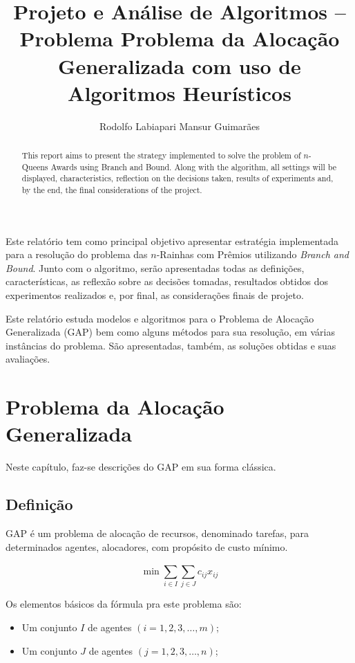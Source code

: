 \documentclass[12pt]{article}
\title{Projeto e Análise de Algoritmos -- \\ Problema Problema da Alocação Generalizada com uso de Algoritmos Heurísticos}
\author{Rodolfo Labiapari Mansur Guimarães}
\begin{document}
\maketitle

\begin{abstract}
	This report aims to present the strategy implemented to solve the problem of $n$-Queens Awards using Branch and Bound. Along with the algorithm, all settings will be displayed, characteristics, reflection on the decisions taken, results of experiments and, by the end, the final considerations of the project.
\end{abstract}

\begin{resumo}
Este relatório tem como principal objetivo apresentar estratégia implementada para a resolução do problema das $n$-Rainhas com Prêmios utilizando \textit{Branch and Bound}. Junto com o algoritmo, serão apresentadas todas as definições, características, as reflexão sobre as decisões tomadas, resultados obtidos dos experimentos realizados e, por final, as  considerações finais de projeto.

Este relatório estuda modelos e algoritmos para o Problema de Alocação Generalizada (GAP) bem como alguns métodos para sua resolução, em várias instâncias do problema. São apresentadas, também, as soluções obtidas e suas avaliações.
\end{resumo}



\section{Problema da Alocação Generalizada}
	Neste capítulo, faz-se descrições do GAP em sua forma clássica.
	\subsection{Definição}
		GAP é um problema de alocação de recursos, denominado tarefas, para determinados agentes, alocadores, com propósito de custo mínimo.
		
		$$\min \sum_{i \in I}^{} \sum_{j \in J}^{} c_{ij}x_{ij}$$
		
		Os elementos básicos da fórmula pra este problema são:
		
		\begin{itemize}
			\item Um conjunto $I$ de agentes $(i = 1, 2, 3, \ldots, m)$;
			
			\item Um conjunto $J$ de agentes $(j = 1, 2, 3, \ldots, n)$;
		\end{itemize}
		
\end{document}
